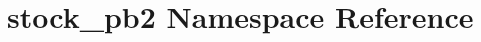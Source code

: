 \hypertarget{namespacestock__pb2}{}\section{stock\+\_\+pb2 Namespace Reference}
\label{namespacestock__pb2}
